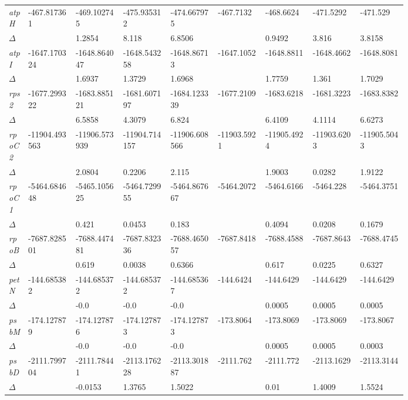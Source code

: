\documentclass[a4paper]{article}
\begin{document}
\begin{longtable}{p{0.03\linewidth}|p{0.095\linewidth}p{0.095\linewidth}p{0.095\linewidth}p{0.095\linewidth}|p{0.095\linewidth}p{0.095\linewidth}p{0.095\linewidth}p{0.095\linewidth}}
\textit{atpH} & -467.817361 & -469.102745 & -475.935312 & -474.667975 & -467.7132 & -468.6624 & -471.5292 & -471.529\\
$\Delta$ &  & 1.2854 & 8.118 & 6.8506 &  & 0.9492 & 3.816 & 3.8158\\
 \rowcolor{black!20} \textit{atpI} & -1647.170324 & -1648.864047 & -1648.543258 & -1648.86713 & -1647.1052 & -1648.8811 & -1648.4662 & -1648.8081\\
 \rowcolor{black!20} $\Delta$ &  & 1.6937 & 1.3729 & 1.6968 &  & 1.7759 & 1.361 & 1.7029\\
\textit{rps2} & -1677.299322 & -1683.885121 & -1681.607197 & -1684.123339 & -1677.2109 & -1683.6218 & -1681.3223 & -1683.8382\\
$\Delta$ &  & 6.5858 & 4.3079 & 6.824 &  & 6.4109 & 4.1114 & 6.6273\\
 \rowcolor{black!20} \textit{rpoC2} & -11904.493563 & -11906.573939 & -11904.714157 & -11906.608566 & -11903.5921 & -11905.4924 & -11903.6203 & -11905.5043\\
 \rowcolor{black!20} $\Delta$ &  & 2.0804 & 0.2206 & 2.115 &  & 1.9003 & 0.0282 & 1.9122\\
\textit{rpoC1} & -5464.684648 & -5465.105625 & -5464.729955 & -5464.867667 & -5464.2072 & -5464.6166 & -5464.228 & -5464.3751\\
$\Delta$ &  & 0.421 & 0.0453 & 0.183 &  & 0.4094 & 0.0208 & 0.1679\\
 \rowcolor{black!20} \textit{rpoB} & -7687.828501 & -7688.447481 & -7687.832336 & -7688.465057 & -7687.8418 & -7688.4588 & -7687.8643 & -7688.4745\\
 \rowcolor{black!20} $\Delta$ &  & 0.619 & 0.0038 & 0.6366 &  & 0.617 & 0.0225 & 0.6327\\
\textit{petN} & -144.685382 & -144.685372 & -144.685372 & -144.685367 & -144.6424 & -144.6429 & -144.6429 & -144.6429\\
$\Delta$ &  & -0.0 & -0.0 & -0.0 &  & 0.0005 & 0.0005 & 0.0005\\
 \rowcolor{black!20} \textit{psbM} & -174.127879 & -174.127876 & -174.127873 & -174.127873 & -173.8064 & -173.8069 & -173.8069 & -173.8067\\
 \rowcolor{black!20} $\Delta$ &  & -0.0 & -0.0 & -0.0 &  & 0.0005 & 0.0005 & 0.0003\\
\textit{psbD} & -2111.799704 & -2111.78441 & -2113.176228 & -2113.301887 & -2111.762 & -2111.772 & -2113.1629 & -2113.3144\\
$\Delta$ &  & -0.0153 & 1.3765 & 1.5022 &  & 0.01 & 1.4009 & 1.5524\\

\end{longtable}
\end{document}
